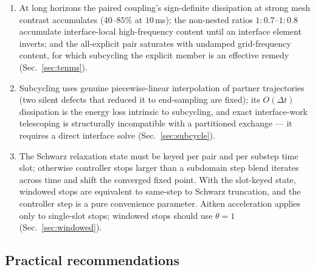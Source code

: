 \documentclass[11pt]{article}
\begin{document}
\begin{enumerate}[itemsep=2pt]
  on conforming and mildly nonconforming meshes in all four combinations,
  and reproduces the monodomain trajectory pointwise
  (Sec.~\ref{sec:paired}).
\item At long horizons the paired coupling's sign-definite dissipation at
  strong mesh contrast accumulates ($40$--$85\%$ at $10$\,ms); the non-nested
  ratios $1{:}0.7$--$1{:}0.8$ accumulate interface-local high-frequency
  content until an interface element inverts; and the all-explicit pair
  saturates with undamped grid-frequency content, for which subcycling the
  explicit member is an effective remedy (Sec.~\ref{sec:tenms}).
\item Subcycling uses genuine piecewise-linear interpolation of partner
  trajectories (two silent defects that reduced it to end-sampling are
  fixed); its $O(\Delta t)$ dissipation is the energy loss intrinsic to subcycling, and
  exact interface-work telescoping is structurally incompatible with a
  partitioned exchange --- it requires a direct interface solve
  (Sec.~\ref{sec:subcycle}).
\item The Schwarz relaxation state must be keyed per pair and per substep
  time slot; otherwise controller stops larger than a subdomain step blend
  iterates across time and shift the converged fixed point. With the
  slot-keyed state, windowed stops are equivalent to same-step to Schwarz
  truncation, and the controller step is a pure convenience parameter.
  Aitken acceleration applies only to single-slot stops; windowed stops
  should use $\theta = 1$ (Sec.~\ref{sec:windowed}).
\end{enumerate}

\subsection{Practical recommendations}
\end{document}
